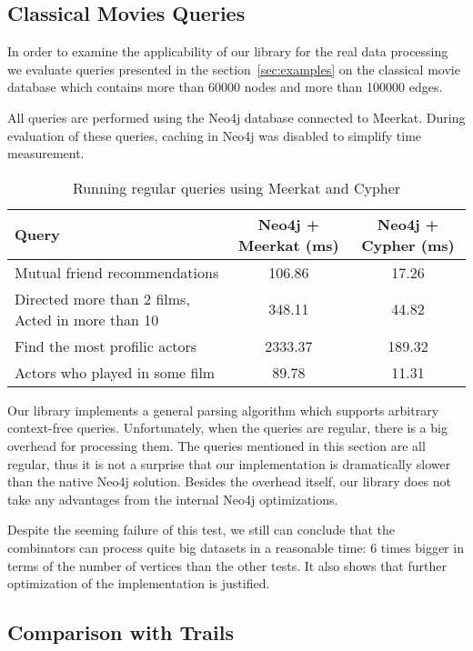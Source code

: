 \subsection{Classical Movies Queries}

In order to examine the applicability of our library for the real data processing we evaluate queries presented in the section~\ref{sec:examples} on the classical movie database which contains more than 60000 nodes and more than 100000 edges.

All queries are performed using the Neo4j database connected to Meerkat.
During evaluation of these queries, caching in Neo4j was disabled to simplify time measurement.

\begin{table*}[t]
\centering
\begin{tabular}{|l|c|c|}
\hline
{Query} &
{Neo4j + Meerkat (ms)} &
{Neo4j + Cypher (ms)} \\
\hline
\hline
Mutual friend recommendations & 106.86 & 17.26 \\
Directed more than 2 films, Acted in more than 10 & 348.11 & 44.82 \\
Find the most profilic actors & 2333.37 & 189.32 \\
Actors who played in some film & 89.78 & 11.31 \\
\hline
\end{tabular}
\caption{Running regular queries using Meerkat and Cypher}
\label{table:movies}
\end{table*}

Our library implements a general parsing algorithm which supports arbitrary context-free queries.
Unfortunately, when the queries are regular, there is a big overhead for processing them.
The queries mentioned in this section are all regular, thus it is not a surprise that our implementation is dramatically slower than the native Neo4j solution. Besides the overhead itself, our library does not take any advantages from the internal Neo4j optimizations.

Despite the seeming failure of this test, we still can conclude that the combinators can process quite big datasets in a reasonable time: 6 times bigger in terms of the number of vertices than the other tests.
It also shows that further optimization of the implementation is justified.

\subsection{Comparison with Trails}

